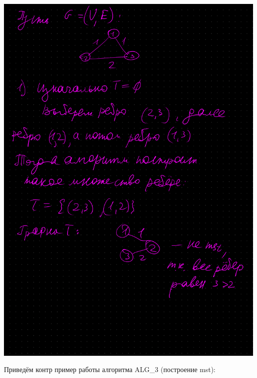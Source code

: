 \documentclass{report}
\begin{document}
\includegraphics[scale=0.7]{a1_alg2_annotated.png}

\pagebreak

Приведём контр пример работы алгоритма ALG\_3 (построение mst):
\end{document}
